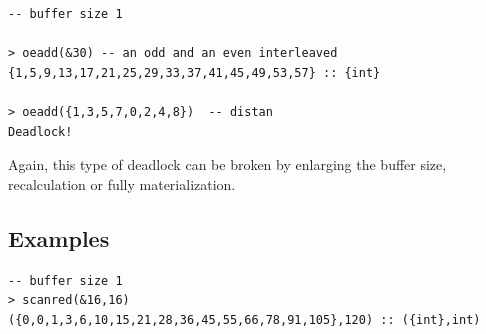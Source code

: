 \begin{itemize}
\begin{lstlisting}[style=nesl-style]
-- buffer size 1

> oeadd(&30) -- an odd and an even interleaved
{1,5,9,13,17,21,25,29,33,37,41,45,49,53,57} :: {int}

> oeadd({1,3,5,7,0,2,4,8})  -- distan
Deadlock!
\end{lstlisting}

Again, this type of deadlock can be broken by enlarging the buffer size, recalculation or fully materialization.


\end{itemize}


%
%
%


\subsection{Examples}




\begin{lstlisting}[style=nesl-style]
-- buffer size 1
> scanred(&16,16)
({0,0,1,3,6,10,15,21,28,36,45,55,66,78,91,105},120) :: ({int},int)
\end{lstlisting}
